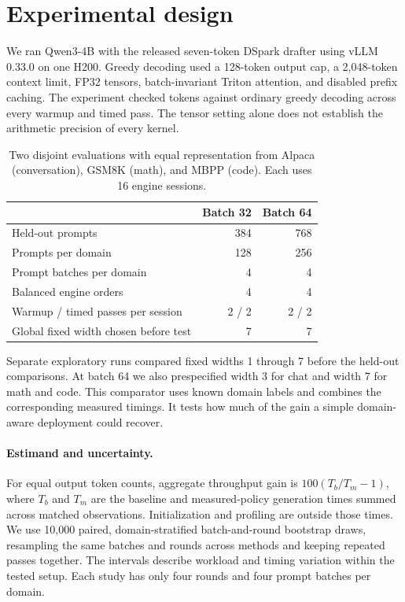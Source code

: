 \documentclass[11pt]{article}
\begin{document}
\section{Experimental design}
We ran Qwen3-4B with the released seven-token DSpark drafter using vLLM 0.33.0 on one H200. Greedy decoding used a 128-token output cap, a 2,048-token context limit, FP32 tensors, batch-invariant Triton attention, and disabled prefix caching. The experiment checked tokens against ordinary greedy decoding across every warmup and timed pass. The tensor setting alone does not establish the arithmetic precision of every kernel.

\begin{table}[h!]\centering\small
\begin{tabular}{lrr}\toprule
 & Batch 32 & Batch 64\\\midrule
Held-out prompts &384&768\\
Prompts per domain &128&256\\
Prompt batches per domain &4&4\\
Balanced engine orders &4&4\\
Warmup / timed passes per session &2 / 2&2 / 2\\
Global fixed width chosen before test &7&7\\\bottomrule
\end{tabular}
\caption{Two disjoint evaluations with equal representation from Alpaca (conversation), GSM8K (math), and MBPP (code). Each uses 16 engine sessions.}
\end{table}

Separate exploratory runs compared fixed widths 1 through 7 before the held-out comparisons. At batch 64 we also prespecified width 3 for chat and width 7 for math and code. This comparator uses known domain labels and combines the corresponding measured timings. It tests how much of the gain a simple domain-aware deployment could recover.

\paragraph{Estimand and uncertainty.} For equal output token counts, aggregate throughput gain is $100(T_b/T_m-1)$, where $T_b$ and $T_m$ are the baseline and measured-policy generation times summed across matched observations. Initialization and profiling are outside those times. We use 10,000 paired, domain-stratified batch-and-round bootstrap draws, resampling the same batches and rounds across methods and keeping repeated passes together. The intervals describe workload and timing variation within the tested setup. Each study has only four rounds and four prompt batches per domain.
\end{document}
